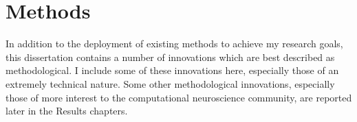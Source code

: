 \chapter{Methods}
In addition to the deployment of existing methods to achieve my research goals, this dissertation contains a number of innovations which are best described as methodological.  I include some of these innovations here, especially those of an extremely technical nature.  Some other methodological innovations, especially those of more interest to the computational neuroscience community, are reported later in the Results chapters.






%